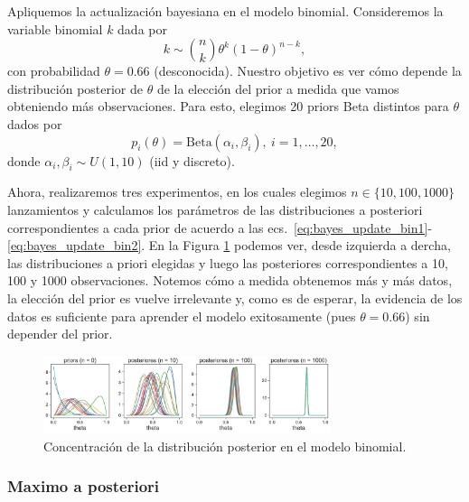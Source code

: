 \begin{mdframed}[style=ejemplo, frametitle={\center Ejemplo: Modelo binomial}]

Apliquemos la actualización bayesiana en el modelo binomial. Consideremos la variable binomial $k$ dada por
\begin{equation}
	k \sim \binom{n}{k}\theta^k(1-\theta)^{n-k},
\end{equation}
con probabilidad $\theta=0.66$ (desconocida). Nuestro objetivo es ver cómo depende la distribución posterior de $\theta$ de la elección del prior a medida que vamos obteniendo más observaciones. Para esto, elegimos 20 priors Beta distintos para $\theta$ dados por 
\begin{equation}
	p_i(\theta)  = \text{Beta}(\alpha_i,\beta_i),\  i=1,\ldots,20,
\end{equation}
donde $\alpha_i,\beta_i\sim U(1,10)$ (iid y discreto).

Ahora, realizaremos tres experimentos, en los cuales elegimos $n\in\{10,100,1000\}$ lanzamientos y calculamos los parámetros de las distribuciones a posteriori correspondientes a cada prior de acuerdo a las ecs.~\eqref{eq:bayes_update_bin1}-\eqref{eq:bayes_update_bin2}. En la Figura \ref{fig:bayes_binomial} podemos ver, desde izquierda a dercha, las  distribuciones a priori elegidas y luego las posteriores correspondientes a 10, 100 y 1000 observaciones. Notemos cómo a medida obtenemos más y más datos, la elección del prior es vuelve irrelevante y, como es de esperar, la evidencia de los datos es suficiente para aprender el modelo exitosamente (pues $\theta  =  0.66$) sin  depender del prior.

\begin{figure}[H] 
	\centering	
	\includegraphics[width=0.75\textwidth,frame ]{img/cap1_bayesian_binomial.pdf}
	\caption{Concentración de la distribución posterior en el modelo binomial.}
	\label{fig:bayes_binomial}
\end{figure}

\end{mdframed}


\subsubsection{Maximo a posteriori}
\label{sub:map}

